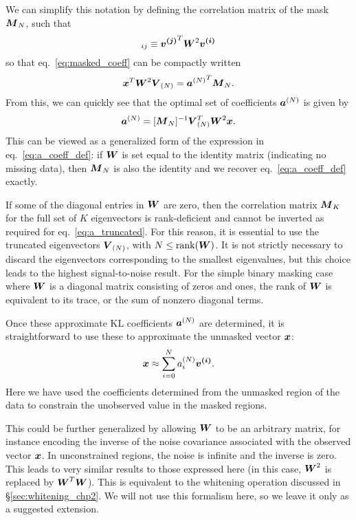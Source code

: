 We can simplify this notation by defining the correlation matrix of the
mask $\boldsymbol{M}_N$, such that
\begin{equation}
  [\mymat{M}_N]_{ij} \equiv \myvec{v^{(j)}}^T \mymat{W}^2 \mymat{v^{(i)}}
\end{equation}
so that eq.~\ref{eq:masked_coeff} can be compactly written
\begin{equation}
  \boldsymbol{x}^T \boldsymbol{W}^2 \boldsymbol{V}_{(N)}
  = {\boldsymbol{a}^{(N)}}^T \boldsymbol{M}_N.
\end{equation}
From this, we can quickly see that the optimal set of coefficients
$\boldsymbol{a}^{(N)}$ is given by
\begin{equation}
  \label{eq:a_truncated}
  \boldsymbol{a}^{(N)} = [\boldsymbol{M}_N]^{-1}
  \boldsymbol{V}_{(N)}^T \boldsymbol{W}^2 \boldsymbol{x}.
\end{equation}
This can be viewed as a generalized form of
the expression in eq.~\ref{eq:a_coeff_def}:
if $\boldsymbol{W}$ is set equal to the identity matrix (indicating no
missing data), then $\boldsymbol{M}_N$ is also the identity and we recover
eq.~\ref{eq:a_coeff_def} exactly.

If some of the diagonal entries in $\boldsymbol{W}$ are zero, then the
correlation matrix $\boldsymbol{M}_K$ for the full set of $K$ eigenvectors
is rank-deficient
and cannot be inverted as required for eq.~\ref{eq:a_truncated}.  For this
reason, it is essential to use the truncated eigenvectors $\boldsymbol{V}_{(N)}$,
with $N \le {\rm rank}(\boldsymbol{W})$.  It is not strictly necessary to
discard the eigenvectors corresponding to the smallest eigenvalues, but this
choice leads to the highest signal-to-noise result.
For the simple binary masking case
where $\boldsymbol{W}$ is a diagonal matrix consisting of zeros and
ones, the rank of $\boldsymbol{W}$ is equivalent to its trace, or the sum
of nonzero diagonal terms.

Once these approximate KL coefficients $\boldsymbol{a}^{(N)}$ are determined,
it is straightforward to use these to approximate the unmasked vector
$\boldsymbol{x}$:
\begin{equation}
  \boldsymbol{x} \approx \sum_{i=0}^N a_i^{(N)} \boldsymbol{v^{(i)}}.
\end{equation}
Here we have used the coefficients determined from the unmasked region of
the data to constrain the unobserved value in the masked regions.

This could be further generalized by allowing $\boldsymbol{W}$ to be an arbitrary
matrix, for instance encoding the inverse of the noise covariance
associated with the observed vector $\boldsymbol{x}$.  In unconstrained regions,
the noise is infinite and the inverse is zero.  This leads to very similar
results to those expressed here (in this case, $\boldsymbol{W}^2$ is replaced
by $\boldsymbol{W}^T\boldsymbol{W}$).  This is equivalent to the whitening operation
discussed in \S\ref{sec:whitening_chp2}. We will not use this formalism
here, so we leave it only as a suggested extension.

